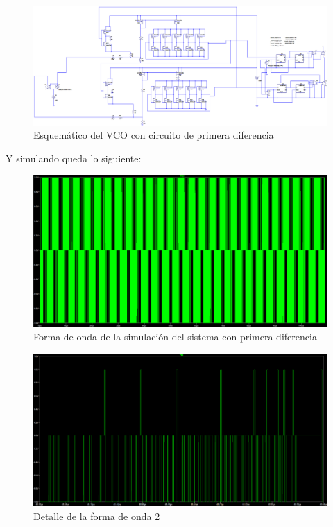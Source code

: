 \documentclass[12pt]{report} %
\begin{document}
	\begin{figure}[H]
		\includegraphics[width=\textwidth]{ltspice-vco-closed-diff.png}
		\caption[Esquemático del VCO con circuito de primera diferencia]{Esquemático del VCO con circuito de primera diferencia}
		\label{fig:ltspice-vco-closed-diff.png}
	\end{figure}
	
	Y simulando queda lo siguiente:
	
	\begin{figure}[H]
		\includegraphics[width=\textwidth]{ltspice-vco-closed-diff-wf.png}
		\caption[Forma de onda de la simulación del sistema con primera diferencia]{Forma de onda de la simulación del sistema con primera diferencia}
		\label{fig:ltspice-vco-closed-diff-wf.png}
	\end{figure}
	
	\begin{figure}[H]
		\includegraphics[width=\textwidth]{ltspice-vco-closed-diff-wf-zoom.png}
		\caption[Detalle de la forma de onda \ref{fig:ltspice-vco-closed-diff-wf.png}]{Detalle de la forma de onda \ref{fig:ltspice-vco-closed-diff-wf.png}}
		\label{fig:ltspice-vco-closed-diff-wf-zoom.png}
	\end{figure}
\end{document}
